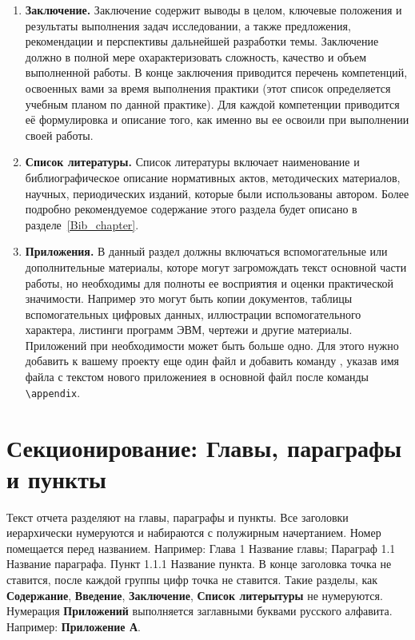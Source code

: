\begin{enumerate}
    \item \textbf{Заключение.}  Заключение содержит выводы в целом, ключевые положения и результаты выполнения задач исследовании, а также предложения, рекомендации и перспективы дальнейшей разработки темы.
    Заключение должно в полной мере охарактеризовать сложность, качество и объем выполненной работы.
    В конце заключения приводится перечень компетенций, освоенных вами за время выполнения практики (этот список определяется учебным планом по данной практике). Для каждой компетенции приводится её формулировка и описание того, как именно вы ее освоили при выполнении своей работы.
    
    \item \textbf{Список литературы.} Список литературы включает наименование и библиографическое описание нормативных 
    актов, методических материалов, научных, периодических изданий, которые были использованы автором. Более подробно рекомендуемое содержание этого раздела будет описано в разделе~\ref{Bib_chapter}.
    
    \item \textbf{Приложения.} В данный раздел должны включаться вспомогательные или дополнительные материалы, которе могут загромождать текст основной части работы, но необходимы для полноты ее восприятия и оценки практической значимости. Например это могут быть копии документов, таблицы вспомогательных цифровых данных, иллюстрации вспомогательного характера, листинги программ ЭВМ, чертежи и другие материалы. Приложений при необходимости может быть больше одно. Для этого нужно добавить к вашему проекту еще один файл и добавить команду \verb||, указав имя файла с текстом нового приложениея в основной файл после команды \verb|\appendix|. 
\end{enumerate}

\section{Секционирование: Главы, параграфы и пункты}

Текст отчета разделяют на главы, параграфы и пункты.
Все заголовки иерархически нумеруются и набираются с полужирным начертанием.
Номер помещается перед названием. Например: Глава 1 Название главы; 
Параграф 1.1 Название параграфа. Пункт 1.1.1 Название пункта. В конце
заголовка точка не ставится, после каждой группы цифр точка не ставится.
Такие разделы, как \textbf{Содержание}, \textbf{Введение}, \textbf{Заключение}, \textbf{Список литерытуры} не нумеруются. Нумерация \textbf{Приложений} выполняется заглавными буквами русского алфавита. Например: \textbf{Приложение А}.

